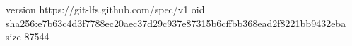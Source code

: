version https://git-lfs.github.com/spec/v1
oid sha256:e7b63c4d3f7788ec20aec37d29c937e87315b6cffbb368ead2f8221bb9432eba
size 87544
